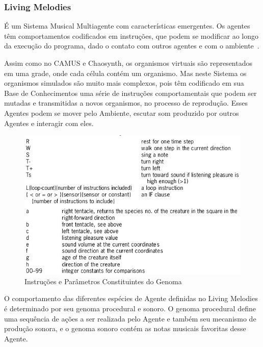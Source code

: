 \documentclass[a4paper, 11pt, twoside]{article}
\begin{document}
\begin{multicols}{2}
\subsubsection{Living Melodies}

É um Sistema Musical Multiagente com características emergentes. Os agentes têm
comportamentos codificados em instruções, que podem se modificar ao longo da 
execução do programa, dado o contato com outros agentes e com o 
ambiente~\cite{d01living}.

Assim como no CAMUS e Chaosynth, os organismos virtuais são representados em 
uma grade, onde cada célula contém um organismo. Mas neste Sistema os 
organismos simulados são muito mais complexos, pois têm codificado em sua Base 
de Conhecimentos uma série de instruções comportamentais que podem ser mutadas 
e transmitidas a novos organismos, no processo de reprodução. Esses Agentes 
podem se mover pelo Ambiente, escutar som produzido por
outros Agentes e interagir com eles.

\begin{figure}[H]
  \centering
  \includegraphics[scale=0.44]{table12.jpg}
  \caption{Instruções e Parâmetros Constituintes do Genoma~\cite{d01living}}
  \label{fig:livingmel1}
\end{figure}

O comportamento das diferentes espécies de Agente definidas no Living Melodies 
é determinado por seu genoma procedural e sonoro. O genoma procedural define 
uma sequência de ações a ser realizada pelo Agente e também seu mecanismo de 
produção sonora, e o genoma sonoro contém as notas musicais favoritas desse 
Agente.


\end{multicols}
\end{document}
